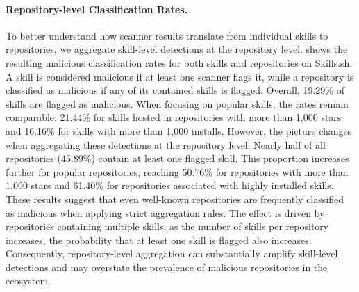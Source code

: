 \paragraph{Repository-level Classification Rates.}



To better understand how scanner results translate from individual skills to repositories, we aggregate skill-level detections at the repository level.  shows the resulting malicious classification rates for both skills and repositories on Skills.sh. A skill is considered malicious if at least one scanner flags it, while a repository is classified as malicious if any of its contained skills is flagged.
Overall, 19.29\% of skills are flagged as malicious. When focusing on popular skills, the rates remain comparable: 21.44\% for skills hosted in repositories with more than 1,000 stars and 16.16\% for skills with more than 1,000 installs. However, the picture changes when aggregating these detections at the repository level. Nearly half of all repositories (45.89\%) contain at least one flagged skill. This proportion increases further for popular repositories, reaching 50.76\% for repositories with more than 1,000 stars and 61.40\% for repositories associated with highly installed skills.
These results suggest that even well-known repositories are frequently classified as malicious when applying strict aggregation rules. The effect is driven by repositories containing multiple skills: as the number of skills per repository increases, the probability that at least one skill is flagged also increases. Consequently, repository-level aggregation can substantially amplify skill-level detections and may overstate the prevalence of malicious repositories in the ecosystem.

